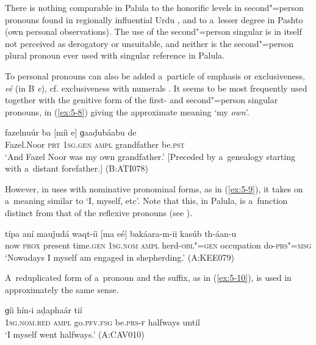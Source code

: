 There is nothing comparable in Palula to the honorific levels in second"=person pronouns found in regionally influential Urdu \citep[17]{schmidt1999}, and to a~lesser degree in Pashto (own personal observations). The use of the second"=person singular is in itself not perceived as derogatory or unsuitable, and neither is the second"=person plural pronoun ever used with singular reference in Palula.

To personal pronouns can also be added a~particle of emphasis or exclusiveness, \textit{eé} (in B \textit{e}), cf. exclusiveness with numerals . It seems to be most frequently used together with the genitive form of the first- and second"=person singular pronouns, in (\ref{ex:5-8}) giving the approximate meaning `my \textit{own}'.



\begin{exe}
\ex
\label{ex:5-8}
\gll fazelnuúr ba [míi e] ɡaaḍubáabu de \\
	Fazel.Noor \textsc{prt} \textsc{1sg.gen} \textsc{ampl} grandfather be.\textsc{pst} \\
\glt `And Fazel Noor was my own grandfather.' [Preceded by a~genealogy starting with a~distant forefather.] (B:ATI078)
\end{exe}

However, in uses with nominative pronominal forms, as in (\ref{ex:5-9}), it takes on a~meaning similar to `I, myself, etc'. Note that this, in Palula, is a~function distinct from that of the reflexive pronouns (see ).

\begin{exe}
\ex
\label{ex:5-9}
\gll típa aní mauǰudá waqt-íi [ma eé] bakáara-m-ii kasúb th-áan-u\\
	now \textsc{prox} present time.\textsc{gen} \textsc{1sg.nom} \textsc{ampl} herd-\textsc{obl"=gen} occupation do-\textsc{prs"=msg}\\
\glt `Nowadays I myself am engaged in shepherding.' (A:KEE079)
\end{exe}


A~reduplicated form of a~pronoun and the suffix, as in (\ref{ex:5-10}), is used in approximately the same sense.


\begin{exe}
\ex
\label{ex:5-10}
\gll [mam eé] ɡíi hín-i aḍaphaár tií\\
\textsc{1sg.nom.red} \textsc{ampl} go.\textsc{pfv.fsg} be.\textsc{prs-f} halfways until \\
\glt `I myself went halfways.' (A:CAV010)
\end{exe}

